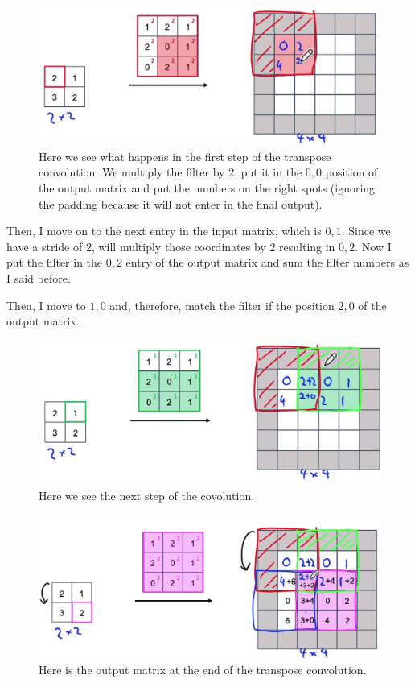 \documentclass[12pt, a4paper, oneside]{book}
\begin{document}
\begin{figure}[h]
\centering
\includegraphics[scale=0.3]{Res/transpose_conv_1.png}
\caption{Here we see what happens in the first step of the transpose
convolution. We multiply the filter by $2$, put it in the $0,0$ position of the
output matrix and put the numbers on the right spots (ignoring the padding
because it will not enter in the final output).}
\label{transpose_conv_1.png}
\end{figure}

Then, I move on to the next entry in the input matrix, which is $0,1$. Since we
have a stride of $2$, will multiply those coordinates by $2$ resulting in $0,2$.
Now I put the filter in the $0,2$ entry of the output matrix and sum the filter
numbers as I said before.

Then, I move to $1,0$ and, therefore, match the filter if the position $2,0$ of
the output matrix.

\begin{figure}[h]
\centering
\includegraphics[scale=0.25]{Res/transpose_conv_2.png}
\caption{Here we see the next step of the covolution.}
\label{transpose_conv_1.png}
\end{figure}

\begin{figure}[h]
\centering
\includegraphics[scale=0.25]{Res/transpose_conv_3.png}
\caption{Here is the output matrix at the end of the transpose convolution.}
\label{transpose_conv_1.png}
\end{figure}
\end{document}
